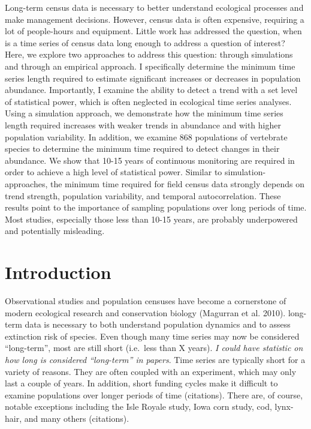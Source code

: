 \documentclass[12pt,]{article}
\begin{document}
Long-term census data is necessary to better understand ecological
processes and make management decisions. However, census data is often
expensive, requiring a lot of people-hours and equipment. Little work
has addressed the question, when is a time series of census data long
enough to address a question of interest? Here, we explore two
approaches to address this question: through simulations and through an
empirical approach. I specifically determine the minimum time series
length required to estimate significant increases or decreases in
population abundance. Importantly, I examine the ability to detect a
trend with a set level of statistical power, which is often neglected in
ecological time series analyses. Using a simulation approach, we
demonstrate how the minimum time series length required increases with
weaker trends in abundance and with higher population variability. In
addition, we examine 868 populations of vertebrate species to determine
the minimum time required to detect changes in their abundance. We show
that 10-15 years of continuous monitoring are required in order to
achieve a high level of statistical power. Similar to
simulation-approaches, the minimum time required for field census data
strongly depends on trend strength, population variability, and temporal
autocorrelation. These results point to the importance of sampling
populations over long periods of time. Most studies, especially those
less than 10-15 years, are probably underpowered and potentially
misleading.

\section{Introduction}\label{introduction}

Observational studies and population censuses have become a cornerstone
of modern ecological research and conservation biology (Magurran et al.
2010). long-term data is necessary to both understand population
dynamics and to assess extinction risk of species. Even though many time
series may now be considered ``long-term'', most are still short
(i.e.~less than X years). \emph{I could have statistic on how long is
considered ``long-term'' in papers}. Time series are typically short for
a variety of reasons. They are often coupled with an experiment, which
may only last a couple of years. In addition, short funding cycles make
it difficult to examine populations over longer periods of time
(citations). There are, of course, notable exceptions including the Isle
Royale study, Iowa corn study, cod, lynx-hair, and many others
(citations).
\end{document}
